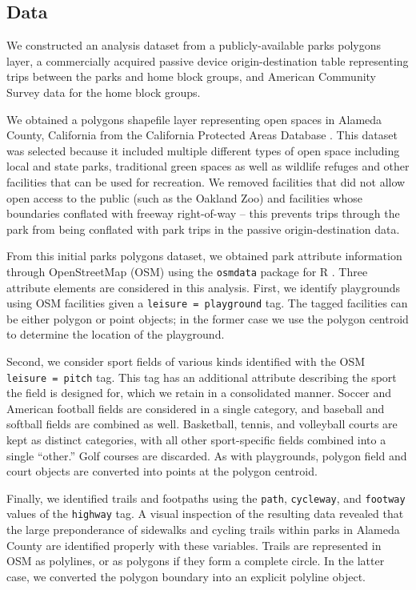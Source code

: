 \documentclass[3p, authoryear]{elsarticle} %
\begin{document}
\hypertarget{data}{%
\subsection{Data}\label{data}}

We constructed an analysis dataset from a publicly-available parks polygons
layer, a commercially acquired passive device origin-destination table
representing trips between the parks and home block groups, and American
Community Survey data for the home block groups.

We obtained a polygons shapefile layer representing open spaces in Alameda
County, California from the California Protected Areas Database \citep{cpad2019}.
This dataset was selected because it included multiple different types of open
space including local and state parks, traditional green spaces as well as
wildlife refuges and other facilities that can be used for recreation. We
removed facilities that did not allow open access to the public (such as the
Oakland Zoo) and facilities whose boundaries conflated with freeway right-of-way
-- this prevents trips through the park from being conflated with park trips in
the passive origin-destination data.

From this initial parks polygons dataset, we obtained park attribute information
through OpenStreetMap (OSM) using the \texttt{osmdata} package for R \citep{osmdata}. Three
attribute elements are considered in this analysis. First, we identify playgrounds
using OSM facilities given a \texttt{leisure\ =\ playground} tag. The tagged facilities can
be either polygon or point objects; in the former case we use the polygon centroid
to determine the location of the playground.

Second, we consider sport fields of various kinds identified with the OSM
\texttt{leisure\ =\ pitch} tag. This tag has an additional attribute describing the sport
the field is designed for, which we retain in a consolidated manner. Soccer and
American football fields are considered in a single category, and baseball and
softball fields are combined as well. Basketball, tennis, and volleyball courts
are kept as distinct categories, with all other sport-specific fields combined
into a single ``other.'' Golf courses are discarded. As with playgrounds, polygon
field and court objects are converted into points at the polygon centroid.

Finally, we identified trails and footpaths using the \texttt{path}, \texttt{cycleway}, and
\texttt{footway} values of the \texttt{highway} tag. A visual inspection of the resulting data
revealed that the large preponderance of sidewalks and cycling trails within parks
in Alameda County are identified properly with these variables. Trails are
represented in OSM as polylines, or as polygons if they form a complete circle.
In the latter case, we converted the polygon boundary into an explicit polyline object.
\end{document}
